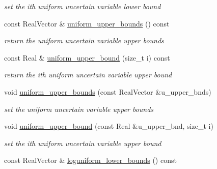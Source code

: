 \begin{DoxyCompactItemize}
\begin{DoxyCompactList}\small\item\em set the ith uniform uncertain variable lower bound \end{DoxyCompactList}\item 
const Real\+Vector \& \hyperlink{classPecos_1_1AleatoryDistParams_aaf95ff8ed6eccfd38398fb44db802f72}{uniform\+\_\+upper\+\_\+bounds} () const \label{classPecos_1_1AleatoryDistParams_aaf95ff8ed6eccfd38398fb44db802f72}

\begin{DoxyCompactList}\small\item\em return the uniform uncertain variable upper bounds \end{DoxyCompactList}\item 
const Real \& \hyperlink{classPecos_1_1AleatoryDistParams_a5604953db4d5ef183a27f5bc71fc4481}{uniform\+\_\+upper\+\_\+bound} (size\+\_\+t i) const \label{classPecos_1_1AleatoryDistParams_a5604953db4d5ef183a27f5bc71fc4481}

\begin{DoxyCompactList}\small\item\em return the ith uniform uncertain variable upper bound \end{DoxyCompactList}\item 
void \hyperlink{classPecos_1_1AleatoryDistParams_a29aee7bc01464e900e2cc87dcfd96cad}{uniform\+\_\+upper\+\_\+bounds} (const Real\+Vector \&u\+\_\+upper\+\_\+bnds)\label{classPecos_1_1AleatoryDistParams_a29aee7bc01464e900e2cc87dcfd96cad}

\begin{DoxyCompactList}\small\item\em set the uniform uncertain variable upper bounds \end{DoxyCompactList}\item 
void \hyperlink{classPecos_1_1AleatoryDistParams_ad9a0874566e94f6eea924dde4e7eba58}{uniform\+\_\+upper\+\_\+bound} (const Real \&u\+\_\+upper\+\_\+bnd, size\+\_\+t i)\label{classPecos_1_1AleatoryDistParams_ad9a0874566e94f6eea924dde4e7eba58}

\begin{DoxyCompactList}\small\item\em set the ith uniform uncertain variable upper bound \end{DoxyCompactList}\item 
const Real\+Vector \& \hyperlink{classPecos_1_1AleatoryDistParams_a81af059b1bdc5b6912d03cf8738ce506}{loguniform\+\_\+lower\+\_\+bounds} () const \label{classPecos_1_1AleatoryDistParams_a81af059b1bdc5b6912d03cf8738ce506}


\end{DoxyCompactItemize}
